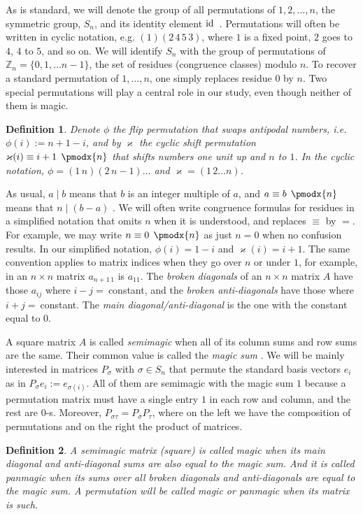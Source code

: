 \documentclass[11pt]{article}
\makeatletter
\renewcommand{\pmod}{%
  \allowbreak
  \if@display\mkern18mu\else\mkern8mu\fi
  \pmodx
}
\theoremstyle{plain}
\newtheorem{definition}{Definition}
\theoremstyle{definition}
\newcommand{\+}[1]{{#1}^\times}
\def\Z{{\mathbb Z}}
\def\s{{\sigma}}
\def\k{{\varkappa}}
\def\id{{\rm id\,}}
\makeatother
\begin{document}
As is standard, we will denote the group of all permutations of $1,2,\dots,n$, the symmetric group, $S_n$, and its identity element $\id$\! \cite{Gallian}. Permutations will often be written in cyclic notation, e.g. $(1)(2\,4\,5\,3)$, where $1$ is a fixed point, $2$ goes to $4$, $4$ to $5$, and so on. We will identify $S_n$ with the group of permutations of $\Z_n=\{0,1,\dots n-1\}$, the set of residues (congruence classes) modulo $n$. To recover a standard permutation of $1,\dots,n$, one simply replaces residue $0$ by $n$. Two special permutations will play a central role in our study, even though neither of them is magic.
\begin{definition}
Denote $\phi$ the flip permutation that swaps antipodal numbers, i.e. $\phi(i):=n+1-i$, and by $\k$ the cyclic shift permutation $\k(i)\equiv i+1\pmod{n}$ that shifts numbers one unit up and $n$ to $1$. In the cyclic notation, $\phi=(1\,n)(2\,n-1)\dots$ and $\k=(1\,2\dots n)$.
\end{definition} 
As usual, $a\mid b$ means that $b$ is an integer multiple of $a$, and $a\equiv b\pmod{n}$ means that $n\mid(b-a)$ \cite{Rosen}. We will often write congruence formulas for residues in a simplified notation that omits $n$ when it is understood, and replaces $\equiv$ by $=$. For example, we may write $n\equiv0\pmod{n}$ as just $n=0$ when no confusion results. In our simplified notation, $\phi(i)=1-i$ and $\k(i)=i+1$. The same convention applies to matrix indices when they go over $n$ or under $1$, for example, in an $n\times n$ matrix $a_{n+1\,1}$ is $a_{11}$. The {\it broken diagonals} of an $n\times n$ matrix $A$ have those $a_{ij}$ where $i-j=\ $constant, and the {\it broken anti-diagonals} have those where $i+j=\ $constant. The {\it main diagonal/anti-diagonal} is the one with the constant equal to $0$.

A square matrix $A$ is called {\it semimagic} when all of its column sums and row sums are the same. Their common value is called the {\it magic sum} \cite{Ess,Nord}. We will be mainly interested in matrices $P_\s$ with $\s\in S_n$ that permute the standard basis vectors $e_i$ as in $P_\s e_i:=e_{\s(i)}$. All of them are semimagic with the magic sum $1$ because a permutation matrix must have a single  entry $1$ in each row and column, and the rest are $0$-s. Moreover, $P_{\s\tau}=P_\s P_\tau$, where on the left we have the composition of permutations and on the right the product of matrices. 
\begin{definition}
A semimagic matrix (square) is called magic when its main diagonal and anti-diagonal sums are also equal to the magic sum. And it is called panmagic when its sums over all broken diagonals and anti-diagonals are equal to the magic sum. A permutation will be called magic or panmagic when its matrix is such.
\end{definition} 
\end{document}
